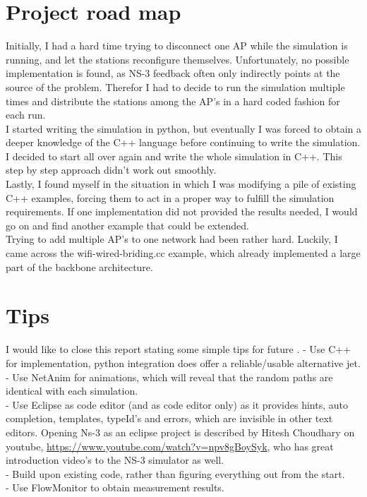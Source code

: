 \section{Project road map} 

Initially, I had a hard time trying to disconnect one AP while the simulation is running, and let the stations reconfigure themselves. Unfortunately, no possible implementation is found, as NS-3 feedback often only indirectly points at the source of the problem. Therefor I had to decide to run the simulation multiple times and distribute the stations among the AP's in a hard coded fashion for each run. \\

I started writing the simulation in python, but eventually I was forced to obtain a deeper knowledge of the C++ language before continuing to write the simulation. I decided to start all over again and write the whole simulation in C++. This step by step approach didn't work out smoothly.\\

Lastly, I found myself in the situation in which I was modifying a pile of existing C++ examples, forcing them to act in a proper way to fulfill the simulation requirements. If one implementation did not provided the results needed, I would go on and find another example that could be extended.\\

Trying to add multiple AP's to one network had been rather hard. Luckily, I came across the wifi-wired-briding.cc example, which already implemented a large part of the backbone architecture. 

\section{Tips} 
I would like to close this report stating some simple tips for future . 
- Use C++ for implementation, python integration does offer a reliable/usable alternative jet.\\
- Use NetAnim for animations, which will reveal that the random paths are identical  with each simulation.\\
- Use Eclipse as code editor (and as code editor only) as it provides hints, auto completion, templates, typeId's and errors, which are invisible in other text editors. Opening Ns-3 as an eclipse project is described by Hitesh Choudhary on youtube, \url{https://www.youtube.com/watch?v=npv8gBoySyk}, who has great introduction video's to the NS-3 simulator as well. \\
- Build upon existing code, rather than figuring everything out from the start.\\
- Use FlowMonitor to obtain measurement results.\\

